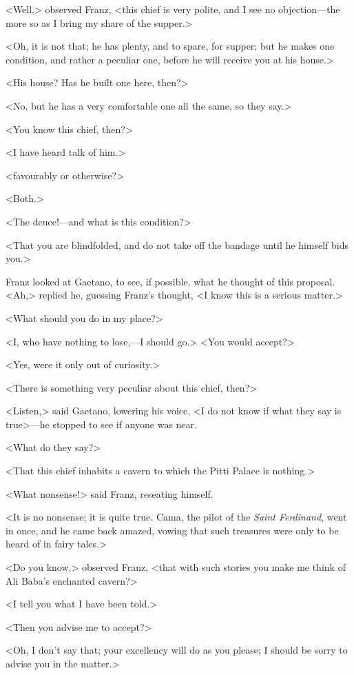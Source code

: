  <Well,> observed Franz, <this chief is very polite, and I see no objection—the more so as I bring my share of the supper.> 

 <Oh, it is not that; he has plenty, and to spare, for supper; but he makes one condition, and rather a peculiar one, before he will receive you at his house.> 

 <His house? Has he built one here, then?> 

 <No, but he has a very comfortable one all the same, so they say.> 

 <You know this chief, then?> 

 <I have heard talk of him.> 

 <favourably or otherwise?> 

 <Both.> 

 <The deuce!—and what is this condition?> 

 <That you are blindfolded, and do not take off the bandage until he himself bids you.> 

 Franz looked at Gaetano, to see, if possible, what he thought of this proposal. <Ah,> replied he, guessing Franz's thought, <I know this is a serious matter.> 

 <What should you do in my place?> 

 <I, who have nothing to lose,—I should go.>  <You would accept?> 

 <Yes, were it only out of curiosity.> 

 <There is something very peculiar about this chief, then?> 

 <Listen,> said Gaetano, lowering his voice, <I do not know if what they say is true>—he stopped to see if anyone was near. 

 <What do they say?> 

 <That this chief inhabits a cavern to which the Pitti Palace is nothing.> 

 <What nonsense!> said Franz, reseating himself. 

 <It is no nonsense; it is quite true. Cama, the pilot of the \textit{Saint Ferdinand}, went in once, and he came back amazed, vowing that such treasures were only to be heard of in fairy tales.> 

 <Do you know,> observed Franz, <that with such stories you make me think of Ali Baba's enchanted cavern?> 

 <I tell you what I have been told.> 

 <Then you advise me to accept?> 

 <Oh, I don't say that; your excellency will do as you please; I should be sorry to advise you in the matter.> 

